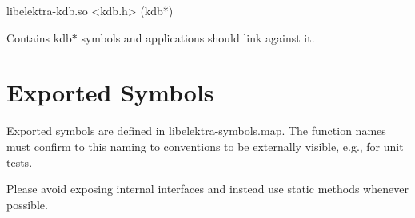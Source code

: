 \begin{DoxyCode}
libelektra-kdb.so
<kdb.h> (kdb*)
\end{DoxyCode}


Contains {\ttfamily kdb$\ast$} symbols and applications should link against it.

\section*{Exported Symbols}

Exported symbols are defined in libelektra-\/symbols.map. The function names must confirm to this naming to conventions to be externally visible, e.\+g., for unit tests.

Please avoid exposing internal interfaces and instead use {\ttfamily static} methods whenever possible. 